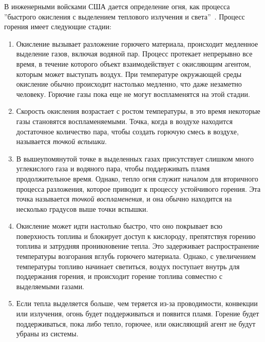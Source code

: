 В инженерными войсками США дается определение огня, как процесса ''быстрого
окисления с выделением теплового излучения и света''~\cite{USArmy}. Процесс
горения имеет следующие стадии:
\begin{enumerate}
    \item Окисление вызывает разложение горючего материала, происходит \break{}
        медленное выделение газов, включая водяной пар.  Процесс протекает
        непрерывно все время, в течение которого объект взаимодействует с
        окисляющим агентом, которым может выступать воздух.  При температуре
        окружающей среды окисление обычно происходит настолько медленно, что
        даже незаметно человеку. Горючие газы пока еще не могут воспламенятся на
        этой стадии.

    \item Скорость окисления возрастает с ростом температуры, в это время
        некоторые газы становятся воспламеняемыми. Точка, когда в воздухе
        находится достаточное количество пара, чтобы создать горючую смесь в
        воздухе, называется \emph{точкой вспышки}.

    \item В вышеупомянутой точке в выделенных газах присутствует слишком много
        углекислого газа и водяного пара, чтобы поддерживать пламя
        продолжительное время. Однако, тепло огня служит началом для вторичного
        процесса разложения, которое приводит к процессу устойчивого горения.
        Эта точка называется \emph{точкой воспламенения}, и она обычно находится
        на несколько градусов выше точки вспышки.

    \item Окисление может идти настолько быстро, что оно покрывает всю
        поверхность топлива и блокирует доступ к кислороду, препятствуя горению
        топлива и затрудняя проникновение тепла. Это задерживает распространение
        температуры возгорания вглубь горючего материала. Однако, с увеличением
        температуры топливо начинает светиться, воздух поступает внутрь для
        поддержания горения, и происходит горение топлива совместно с
        выделяемыми газами.

    \item Если тепла выделяется больше, чем теряется из-за проводимости,
        конвекции или излучения, огонь будет поддерживаться и появится пламя.
        Горение будет поддерживаться, пока либо тепло, горючее, или окисляющий
        агент не будут убраны из системы.
\end{enumerate}

